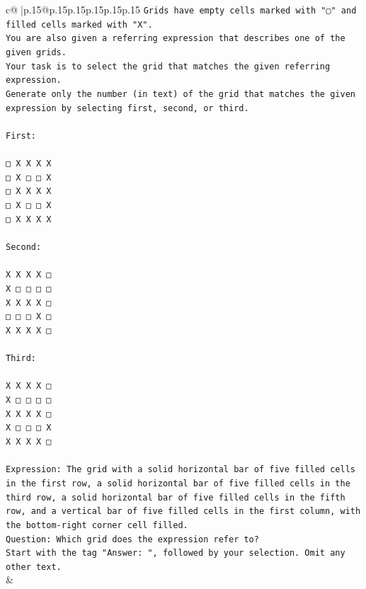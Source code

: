 \documentclass{article}
\begin{document}
{\begin{supertabular}{c@{$\;$}|p{.15\linewidth}@{}p{.15\linewidth}p{.15\linewidth}p{.15\linewidth}p{.15\linewidth}p{.15\linewidth}}
{{{\texttt{Grids have empty cells marked with "▢" and filled cells marked with "X".} \\
\texttt{You are also given a referring expression that describes one of the given grids.} \\
\texttt{Your task is to select the grid that matches the given referring expression.} \\
\texttt{Generate only the number (in text) of the grid that matches the given expression by selecting first, second, or third.} \\
\\ 
\texttt{First:} \\
\\ 
\texttt{□ X X X X} \\
\texttt{□ X □ □ X} \\
\texttt{□ X X X X} \\
\texttt{□ X □ □ X} \\
\texttt{□ X X X X} \\
\\ 
\texttt{Second:} \\
\\ 
\texttt{X X X X □} \\
\texttt{X □ □ □ □} \\
\texttt{X X X X □} \\
\texttt{□ □ □ X □} \\
\texttt{X X X X □} \\
\\ 
\texttt{Third:} \\
\\ 
\texttt{X X X X □} \\
\texttt{X □ □ □ □} \\
\texttt{X X X X □} \\
\texttt{X □ □ □ X} \\
\texttt{X X X X □} \\
\\ 
\texttt{Expression: The grid with a solid horizontal bar of five filled cells in the first row, a solid horizontal bar of five filled cells in the third row, a solid horizontal bar of five filled cells in the fifth row, and a vertical bar of five filled cells in the first column, with the bottom{-}right corner cell filled.} \\
\texttt{Question: Which grid does the expression refer to?} \\
\texttt{Start with the tag "Answer: ", followed by your selection. Omit any other text.} \\
            }
        }
    }
    & \\ \\


\end{supertabular}}
\end{document}
